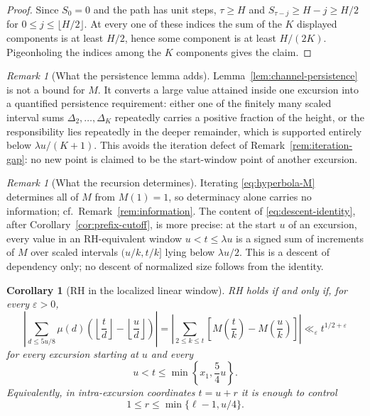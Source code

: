 \documentclass[11pt]{amsart}
\numberwithin{equation}{section}
\theoremstyle{plain}
\newtheorem{corollary}[theorem]{Corollary}
\theoremstyle{definition}
\theoremstyle{remark}
\newtheorem{remark}[theorem]{Remark}
\newcommand{\eps}{\varepsilon}
\begin{document}
\begin{proof}
Since $S_0=0$ and the path has unit steps, $\tau\ge H$ and
$S_{\tau-j}\ge H-j\ge H/2$ for
$0\le j\le\lfloor H/2\rfloor$.  At every one of these indices the sum of
the $K$ displayed components is at least $H/2$, hence some component is at
least $H/(2K)$.  Pigeonholing the indices among the $K$ components gives the
claim.
\end{proof}

\begin{remark}[What the persistence lemma adds]
\label{rem:persistence-content}
Lemma~\ref{lem:channel-persistence} is not a bound for $M$.  It converts a
large value attained inside one excursion into a quantified persistence
requirement: either one of the finitely many scaled interval sums
$\Delta_2,\ldots,\Delta_K$ repeatedly carries a positive fraction of the
height, or the responsibility lies repeatedly in the deeper remainder,
which is supported entirely below $\lambda u/(K+1)$.  This avoids the
iteration defect of Remark~\ref{rem:iteration-gap}: no new point is claimed
to be the start-window point of another excursion.
\end{remark}

\begin{remark}[What the recursion determines]
\label{rem:recursion-content}
Iterating \eqref{eq:hyperbola-M} determines all of $M$ from $M(1)=1$, so
determinacy alone carries no information; cf.\
Remark~\ref{rem:information}.  The content of
\eqref{eq:descent-identity}, after Corollary~\ref{cor:prefix-cutoff}, is
more precise: at the start $u$ of an excursion, every value in an
RH-equivalent window $u<t\le\lambda u$ is a signed sum of increments of
$M$ over scaled intervals $(u/k,t/k]$ lying below $\lambda u/2$.  This is a
descent of dependency only; no descent of normalized size follows from the
identity.
\end{remark}

\begin{corollary}[RH in the localized linear window]
\label{cor:linear-window-RH}
RH holds if and only if, for every $\eps>0$,
\[
\left|\sum_{d\le5u/8}\mu(d)\left(\left\lfloor\frac td\right\rfloor
-\left\lfloor\frac ud\right\rfloor\right)\right|
=\left|\sum_{2\le k\le t}\left[M\left(\frac tk\right)-M\left(\frac uk\right)\right]\right|
\ll_\eps t^{1/2+\eps}
\]
for every excursion starting at $u$ and every
\[
u<t\le\min\left\{x_1,\frac54u\right\}.
\]
Equivalently, in intra-excursion coordinates $t=u+r$ it is enough to
control
\[
1\le r\le\min\{\ell-1,u/4\}.
\]
\end{corollary}
\end{document}
